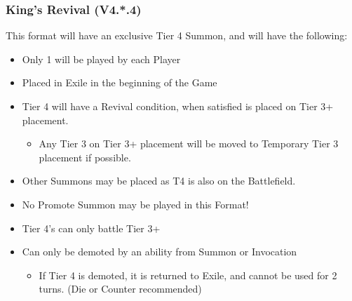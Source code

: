 \subsubsection{King's Revival (V4.*.4)}
This format will have an exclusive Tier 4 Summon, and will have the following: 
\begin{itemize}
    \item Only 1 will be played by each Player
    \item Placed in Exile in the beginning of the Game
    \item Tier 4 will have a Revival condition, when satisfied is placed on Tier 3+ placement. 
        \begin{itemize}
            \item Any Tier 3 on Tier 3+ placement will be moved to Temporary Tier 3 placement 
            if possible. 
        \end{itemize}
    \item Other Summons may be placed as T4 is also on the Battlefield. 
    \item No Promote Summon may be played in this Format!
    \item Tier 4's can only battle Tier 3+
    \item Can only be demoted by an ability from Summon or Invocation
        \begin{itemize}
            \item If Tier 4 is demoted, it is returned to Exile, and cannot be used for 2 turns. (Die or Counter recommended)
        \end{itemize}
\end{itemize}
